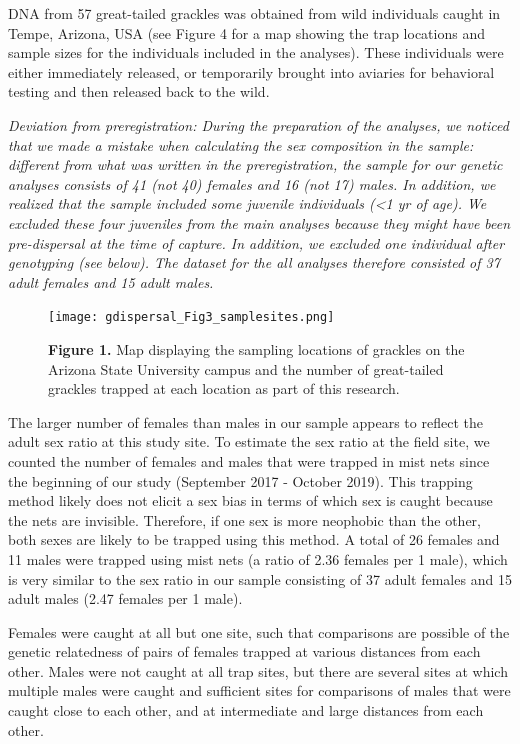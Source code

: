 \documentclass[]{article}
\begin{document}
DNA from 57 great-tailed grackles was obtained from wild individuals
caught in Tempe, Arizona, USA (see Figure 4 for a map showing the trap
locations and sample sizes for the individuals included in the
analyses). These individuals were either immediately released, or
temporarily brought into aviaries for behavioral testing and then
released back to the wild.

\emph{Deviation from preregistration: During the preparation of the
analyses, we noticed that we made a mistake when calculating the sex
composition in the sample: different from what was written in the
preregistration, the sample for our genetic analyses consists of 41 (not
40) females and 16 (not 17) males. In addition, we realized that the
sample included some juvenile individuals (\textless{}1 yr of age). We
excluded these four juveniles from the main analyses because they might
have been pre-dispersal at the time of capture. In addition, we excluded
one individual after genotyping (see below). The dataset for the all
analyses therefore consisted of 37 adult females and 15 adult males.}

\begin{figure}
\centering
\texttt{[image: gdispersal\_Fig3\_samplesites.png]}
\caption{\textbf{Figure 1.} Map displaying the sampling locations of
grackles on the Arizona State University campus and the number of
great-tailed grackles trapped at each location as part of this
research.}
\end{figure}

The larger number of females than males in our sample appears to reflect
the adult sex ratio at this study site. To estimate the sex ratio at the
field site, we counted the number of females and males that were trapped
in mist nets since the beginning of our study (September 2017 - October
2019). This trapping method likely does not elicit a sex bias in terms
of which sex is caught because the nets are invisible. Therefore, if one
sex is more neophobic than the other, both sexes are likely to be
trapped using this method. A total of 26 females and 11 males were
trapped using mist nets (a ratio of 2.36 females per 1 male), which is
very similar to the sex ratio in our sample consisting of 37 adult
females and 15 adult males (2.47 females per 1 male).

Females were caught at all but one site, such that comparisons are
possible of the genetic relatedness of pairs of females trapped at
various distances from each other. Males were not caught at all trap
sites, but there are several sites at which multiple males were caught
and sufficient sites for comparisons of males that were caught close to
each other, and at intermediate and large distances from each other.
\end{document}
